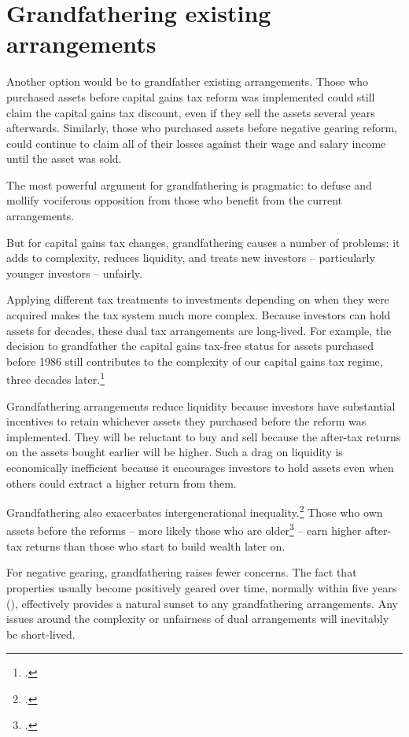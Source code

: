 \section{Grandfathering existing arrangements}
Another option would be to grandfather existing arrangements. Those who purchased assets before capital gains tax reform was implemented could still claim the capital gains tax discount, even if they sell the assets several years afterwards. Similarly, those who purchased assets before negative gearing reform, could continue to claim all of their losses against their wage and salary income until the asset was sold.

The most powerful argument for grandfathering is pragmatic: to defuse and mollify vociferous opposition from those who benefit from the current arrangements.

But for capital gains tax changes, grandfathering causes a number of problems: it adds to complexity, reduces liquidity, and treats new investors – particularly younger investors – unfairly.

Applying different tax treatments to investments depending on when they were acquired makes the tax system much more complex. Because investors can hold assets for decades, these dual tax arrangements are long-lived.  For example, the decision to grandfather the capital gains tax-free status for assets purchased before 1986 still contributes to the complexity of our capital gains tax regime, three decades later.\footcite[][75]{HenryTaxReview2010} 

Grandfathering arrangements reduce liquidity because investors have substantial incentives to retain whichever assets they purchased before the reform was implemented. They will be reluctant to buy and sell because the after-tax returns on the assets bought earlier will be higher. Such a drag on liquidity is economically inefficient because it encourages investors to hold assets even when others could extract a higher return from them. 

Grandfathering also exacerbates intergenerational inequality.\footcite{DaleyWoodWeidmannEtAl2014}  Those who own assets before the reforms – more likely those who are older\footcite[][14]{DaleyWoodWeidmannEtAl2014}  – earn higher after-tax returns than those who start to build wealth later on. 

For negative gearing, grandfathering raises fewer concerns. The fact that properties usually become positively geared over time, normally within five years (), effectively provides a natural sunset to any grandfathering arrangements. Any issues around the complexity or unfairness of dual arrangements will inevitably be short-lived.%
\enlargethispage*{-0.5\baselineskip}

